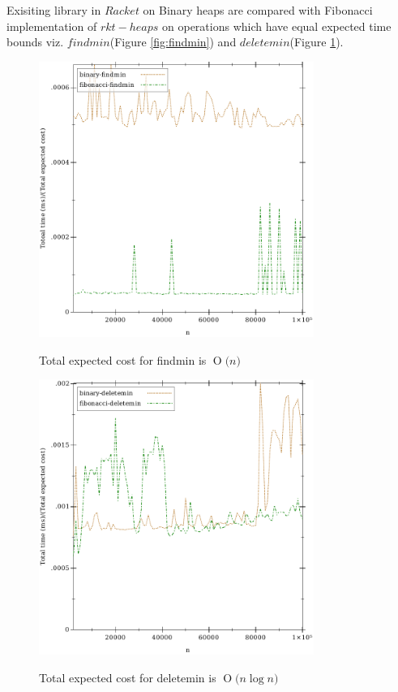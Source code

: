 \documentclass{llncs}
\newcommand{\BigO}[1]{\ensuremath{\operatorname{O}\bigl(#1\bigr)}}
\begin{document}
Exisiting library in $Racket$ on Binary heaps are compared with Fibonacci implementation of $rkt-heaps$ on operations which have equal expected time bounds viz. $findmin$(Figure \ref{fig:findmin}) and $deletemin$(Figure \ref{fig:deletemin}).
\begin{figure}
	\begin{center}

		\includegraphics[width=0.8\textwidth]{FIG/findmin.pdf}
		\caption{Total expected cost for findmin is \BigO{n}}
		\label{fig:findmin}
		\includegraphics[width=0.8\textwidth]{FIG/deletemin.pdf}
		\caption{Total expected cost for deletemin is \BigO{n \log n}}
		\label{fig:deletemin}
	\end{center}
\end{figure}
\end{document}
